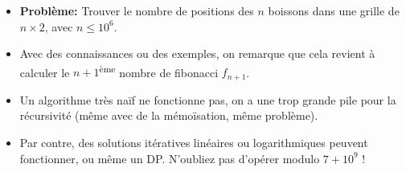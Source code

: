 \begin{frame}
    \frametitle{\problemtitle}
    \begin{itemize}
        \item<+-> \textbf{Problème:} Trouver le nombre de positions des $n$ boissons dans une grille de $n\times 2$, avec $n \le 10^{6}$.
        \item<+-> Avec des connaissances ou des exemples, on remarque que cela revient à calculer le $n+1$\textsuperscript{ème} nombre de fibonacci $f_{n+1}$.
        \item<+-> Un algorithme très na\"if ne fonctionne pas, on a une trop grande pile pour la récursivité (même avec de la mémo\"isation, même problème).
        \item<+-> Par contre, des solutions itératives linéaires ou logarithmiques peuvent fonctionner, ou même un DP. N'oubliez pas d'opérer modulo $7+10^9$ !
    \end{itemize}
    \solvestats
\end{frame}
